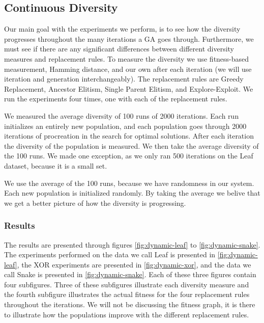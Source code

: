 \subsection{Continuous Diversity}
\label{sec:continuousdiversity}

Our main goal with the experiments we perform, is to see how the diversity progresses throughout the many iterations a GA goes through. Furthermore, we must see if there are any significant differences between different diversity measures and replacement rules. To measure the diversity we use fitness-based measurement, Hamming distance, and our own \dia{} after each iteration (we will use iteration and generation interchangeably). The replacement rules are Greedy Replacement, Ancestor Elitism, Single Parent Elitism, and Explore-Exploit. We run the experiments four times, one with each of the replacement rules.

We measured the average diversity of \num{100} runs of \num{2000} iterations. Each run initializes an entirely new population, and each population goes through \num{2000} iterations of procreation in the search for optimal solutions. After each iteration the diversity of the population is measured. We then take the average diversity of the \num{100} runs. We made one exception, as we only ran \num{500} iterations on the Leaf dataset, because it is a small set.%

We use the average of the \num{100} runs, because we have randomness in our system. Each new population is initialized randomly. By taking the average we belive that we get a better picture of how the diversity is progressing.

\subsubsection{Results}
The results are presented through figures \ref{fig:dynamic-leaf} to \ref{fig:dynamic-snake}. The experiments performed on the data we call Leaf is presented in \cref{fig:dynamic-leaf}, the XOR experiments are presented in \cref{fig:dynamic-xor}, and the data we call Snake is presented in \cref{fig:dynamic-snake}. Each of these three figures contain four subfigures. Three of these subfigures illustrate each diversity measure and the fourth subfigure illustrates the actual fitness for the four replacement rules throughout the iterations. We will not be discussing the fitness graph, it is there to illustrate how the populations improve with the different replacement rules.

